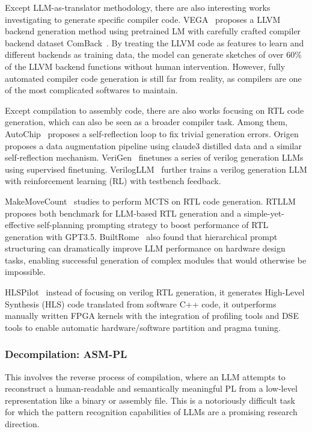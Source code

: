 \documentclass[pdflatex,sn-mathphys-ay,twocolumn, a4paper]{sn-jnl}%
\theoremstyle{thmstyleone}%
\theoremstyle{thmstyletwo}%
\theoremstyle{thmstylethree}%
\begin{document}
Except LLM-as-translator methodology, there are also interesting works investigating to generate specific compiler code. VEGA~\citep{44_vega2025_cgo} proposes a LLVM backend generation method using pretrained LM with carefully crafted compiler backend dataset ComBack~\citep{88_comback2024_neurips}. By treating the LLVM code as features to learn and different backends as training data, the model can generate sketches of over 60\% of the LLVM backend functions without human intervention. However, fully automated compiler code generation is still far from reality, as compilers are one of the most complicated softwares to maintain.

Except compilation to assembly code, there are also works focusing on RTL code generation, which can also be seen as a broader compiler task. Among them, 
AutoChip~\citep{135_thakur2023autochip} proposes a self-reflection loop to fix trivial generation errors. 
Origen~\citep{124_cui2024origen} proposes a data augmentation pipeline using claude3 distilled data and a similar self-reflection mechanism.
VeriGen~\citep{104_verigen2024} finetunes a series of verilog generation LLMs using supervised finetuning.
VerilogLLM~\citep{64_wang2025insights} further trains a verilog generation LLM with reinforcement learning (RL) with testbench feedback. 

MakeMoveCount~\citep{111_delorenzo2024make} studies to perform MCTS on RTL code generation.
RTLLM~\citep{114_lu2024rtllm} proposes both benchmark for LLM-based RTL generation and a simple-yet-effective self-planning prompting strategy to boost performance of RTL generation with GPT3.5.
BuiltRome~\citep{120_nakkab2024rome} also found that hierarchical prompt structuring can dramatically improve LLM performance on hardware design tasks, enabling successful generation of complex modules that would otherwise be impossible.

HLSPilot~\citep{98_xiong2024hlspilot} instead of focusing on verilog RTL generation, it generates High-Level Synthesis (HLS) code translated from software C++ code, it outperforms manually written FPGA kernels with the integration of profiling tools and DSE tools to enable automatic hardware/software partition and pragma tuning.

\subsubsection{Decompilation: ASM-PL}

This involves the reverse process of compilation, where an LLM attempts to reconstruct a human-readable and semantically meaningful PL from a low-level representation like a binary or assembly file. This is a notoriously difficult task for which the pattern recognition capabilities of LLMs are a promising research direction.
\end{document}
